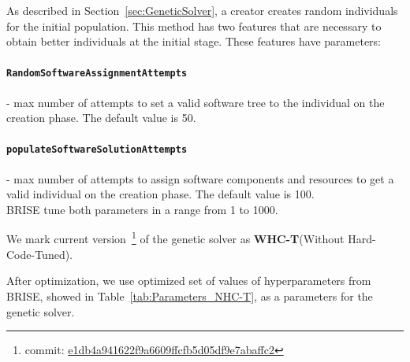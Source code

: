 As described in Section~\ref{sec:GeneticSolver}, a creator creates random individuals for the initial population.
This method has two features that are necessary to obtain better individuals at the initial stage. These features have parameters:
	 \paragraph{\texttt{RandomSoftwareAssignmentAttempts}} - max number of attempts to set a valid software tree to the individual on the creation phase. The default value is 50.
	 \paragraph{\texttt{populateSoftwareSolutionAttempts}} -  max number of attempts to assign software components and resources to get a valid individual on the creation phase. The default value is 100.\\

BRISE tune both parameters in a range from 1 to 1000.

We mark current version~\footnote{commit: \href{https://git-st.inf.tu-dresden.de/mquat/mquat2/commit/e1db4a941622f9a6609ffcfb5d05df9e7abaffc2}{e1db4a941622f9a6609ffcfb5d05df9e7abaffc2}} of the genetic solver as \textbf{WHC-T}(Without Hard-Code-Tuned).

After optimization, we use optimized set of values of hyperparameters from BRISE, showed in Table~\ref{tab:Parameters_NHC-T}, as a parameters for the genetic solver. 

\begin{table}
	\centering
	\caption{Parameters of WHC-T version of the genetic solver}\label{tab:Parameters_NHC-T}
\end{table}

